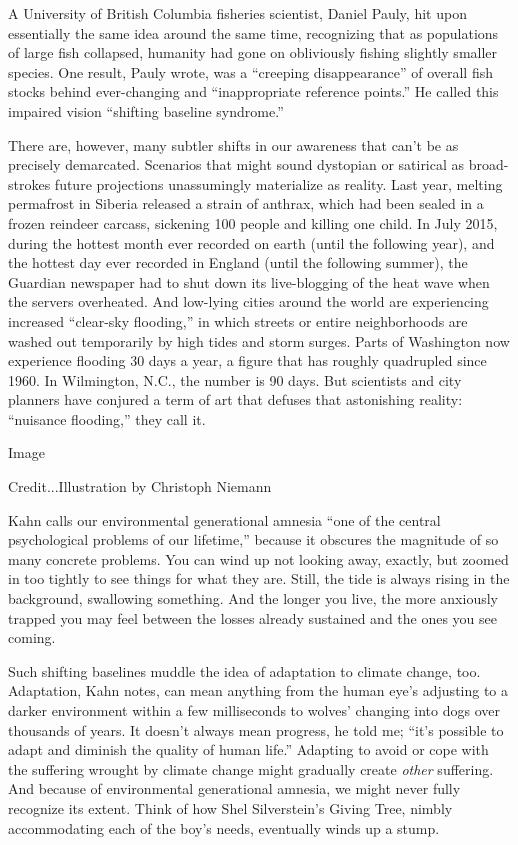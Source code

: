 A University of British Columbia fisheries scientist, Daniel Pauly, hit
upon essentially the same idea around the same time, recognizing that as
populations of large fish collapsed, humanity had gone on obliviously
fishing slightly smaller species. One result, Pauly wrote, was a
``creeping disappearance'' of overall fish stocks behind ever-changing
and ``inappropriate reference points.'' He called this impaired vision
``shifting baseline syndrome.''

There are, however, many subtler shifts in our awareness that can't be
as precisely demarcated. Scenarios that might sound dystopian or
satirical as broad-strokes future projections unassumingly materialize
as reality. Last year, melting permafrost in Siberia released a strain
of anthrax, which had been sealed in a frozen reindeer carcass,
sickening 100 people and killing one child. In July 2015, during the
hottest month ever recorded on earth (until the following year), and the
hottest day ever recorded in England (until the following summer), the
Guardian newspaper had to shut down its live-blogging of the heat wave
when the servers overheated. And low-lying cities around the world are
experiencing increased ``clear-sky flooding,'' in which streets or
entire neighborhoods are washed out temporarily by high tides and storm
surges. Parts of Washington now experience flooding 30 days a year, a
figure that has roughly quadrupled since 1960. In Wilmington, N.C., the
number is 90 days. But scientists and city planners have conjured a term
of art that defuses that astonishing reality: ``nuisance flooding,''
they call it.

Image

Credit...Illustration by Christoph Niemann

Kahn calls our environmental generational amnesia ``one of the central
psychological problems of our lifetime,'' because it obscures the
magnitude of so many concrete problems. You can wind up not looking
away, exactly, but zoomed in too tightly to see things for what they
are. Still, the tide is always rising in the background, swallowing
something. And the longer you live, the more anxiously trapped you may
feel between the losses already sustained and the ones you see coming.

Such shifting baselines muddle the idea of adaptation to climate change,
too. Adaptation, Kahn notes, can mean anything from the human eye's
adjusting to a darker environment within a few milliseconds to wolves'
changing into dogs over thousands of years. It doesn't always mean
progress, he told me; ``it's possible to adapt and diminish the quality
of human life.'' Adapting to avoid or cope with the suffering wrought by
climate change might gradually create \emph{other} suffering. And
because of environmental generational amnesia, we might never fully
recognize its extent. Think of how Shel Silverstein's Giving Tree,
nimbly accommodating each of the boy's needs, eventually winds up a
stump.

